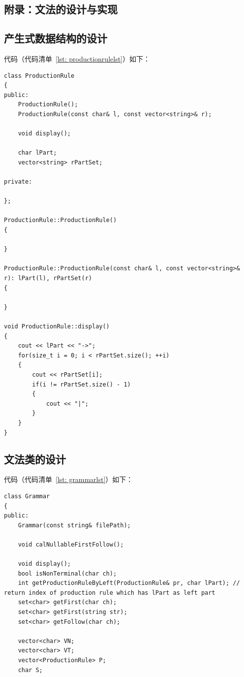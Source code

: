 \documentclass{article}
\begin{document}
\begin{CJK*}{UTF8}{gbsn}
\section{附录：文法的设计与实现} \label{sec: appendix}
\subsection{产生式数据结构的设计}
代码（代码清单~\ref{lst: productionrulelst}）如下：
\begin{center}
\begin{lstlisting}[caption = {产生式数据结构的设计代码清单}, label = {lst: productionrulelst}]
class ProductionRule
{
public:
	ProductionRule();
	ProductionRule(const char& l, const vector<string>& r);

	void display();

	char lPart;
	vector<string> rPartSet;

private:

};

ProductionRule::ProductionRule()
{

}

ProductionRule::ProductionRule(const char& l, const vector<string>& r): lPart(l), rPartSet(r)
{

}

void ProductionRule::display()
{
	cout << lPart << "->";
	for(size_t i = 0; i < rPartSet.size(); ++i)
	{
		cout << rPartSet[i];
		if(i != rPartSet.size() - 1)
		{
			cout << "|";
		}
	}
}
\end{lstlisting}
\end{center}

\subsection{文法类的设计}
代码（代码清单~\ref{lst: grammarlst}）如下：
\begin{center}
\begin{lstlisting}[caption = {文法类的设计代码清单}, label = {lst: grammarlst}]
class Grammar
{
public:
	Grammar(const string& filePath);

	void calNullableFirstFollow();

	void display();
	bool isNonTerminal(char ch);
	int getProductionRuleByLeft(ProductionRule& pr, char lPart); // return index of production rule which has lPart as left part
	set<char> getFirst(char ch);
	set<char> getFirst(string str);
	set<char> getFollow(char ch);

	vector<char> VN;
	vector<char> VT;
	vector<ProductionRule> P;
	char S;


\end{lstlisting}
\end{center}
\end{CJK*}
\end{document}
